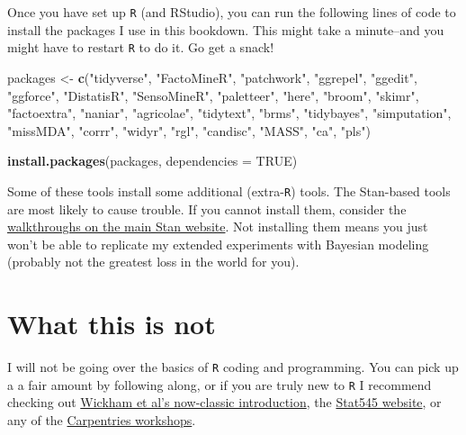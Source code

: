 \documentclass[
]{book}
\newenvironment{Shaded}{\begin{snugshade}}{\end{snugshade}}
\newcommand{\AttributeTok}[1]{\textcolor[rgb]{0.13,0.29,0.53}{#1}}
\newcommand{\ConstantTok}[1]{\textcolor[rgb]{0.56,0.35,0.01}{#1}}
\newcommand{\FunctionTok}[1]{\textcolor[rgb]{0.13,0.29,0.53}{\textbf{#1}}}
\newcommand{\NormalTok}[1]{#1}
\newcommand{\OtherTok}[1]{\textcolor[rgb]{0.56,0.35,0.01}{#1}}
\newcommand{\StringTok}[1]{\textcolor[rgb]{0.31,0.60,0.02}{#1}}
\begin{document}
Once you have set up \texttt{R} (and RStudio), you can run the following lines of code to install the packages I use in this bookdown. This might take a minute--and you might have to restart \texttt{R} to do it. Go get a snack!

\begin{Shaded}
\begin{Highlighting}[]
\NormalTok{packages }\OtherTok{\textless{}{-}} \FunctionTok{c}\NormalTok{(}\StringTok{"tidyverse"}\NormalTok{, }\StringTok{"FactoMineR"}\NormalTok{, }\StringTok{"patchwork"}\NormalTok{, }\StringTok{"ggrepel"}\NormalTok{, }\StringTok{"ggedit"}\NormalTok{, }\StringTok{"ggforce"}\NormalTok{, }\StringTok{"DistatisR"}\NormalTok{, }\StringTok{"SensoMineR"}\NormalTok{, }\StringTok{"paletteer"}\NormalTok{, }\StringTok{"here"}\NormalTok{, }\StringTok{"broom"}\NormalTok{, }\StringTok{"skimr"}\NormalTok{, }\StringTok{"factoextra"}\NormalTok{, }\StringTok{"naniar"}\NormalTok{, }\StringTok{"agricolae"}\NormalTok{, }\StringTok{"tidytext"}\NormalTok{, }\StringTok{"brms"}\NormalTok{, }\StringTok{"tidybayes"}\NormalTok{, }\StringTok{"simputation"}\NormalTok{, }\StringTok{"missMDA"}\NormalTok{, }\StringTok{"corrr"}\NormalTok{, }\StringTok{"widyr"}\NormalTok{, }\StringTok{"rgl"}\NormalTok{, }\StringTok{"candisc"}\NormalTok{, }\StringTok{"MASS"}\NormalTok{, }\StringTok{"ca"}\NormalTok{, }\StringTok{"pls"}\NormalTok{)}

\FunctionTok{install.packages}\NormalTok{(packages, }\AttributeTok{dependencies =} \ConstantTok{TRUE}\NormalTok{)}
\end{Highlighting}
\end{Shaded}

Some of these tools install some additional (extra-\texttt{R}) tools. The Stan-based tools are most likely to cause trouble. If you cannot install them, consider the \href{https://mc-stan.org/users/interfaces/}{walkthroughs on the main Stan website}. Not installing them means you just won't be able to replicate my extended experiments with Bayesian modeling (probably not the greatest loss in the world for you).

\section*{What this is not}\label{what-this-is-not}

I will not be going over the basics of \texttt{R} coding and programming. You can pick up a a fair amount by following along, or if you are truly new to \texttt{R} I recommend checking out \href{https://r4ds.hadley.nz/}{Wickham et al's now-classic introduction}, the \href{https://stat545.com/}{Stat545 website}, or any of the \href{https://datacarpentry.org/r-socialsci/}{Carpentries workshops}.
\end{document}
